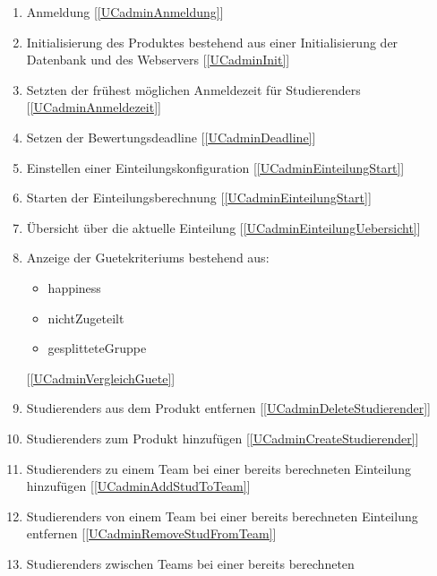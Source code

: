 \documentclass[parskip=full]{scrartcl}
\newcommand{\swtLabel}[1]{\textbf{/#1\arabic*0/}}
\newcommand{\testRef}[1]{[\ref{#1}]}
\begin{document}
\begin{enumerate}[label=\swtLabel{FA}, resume]
  \item Anmeldung \label{FAadminAnmeldung} \testRef{UCadminAnmeldung}
  \item Initialisierung des Produktes bestehend aus einer Initialisierung der
  Datenbank und des Webservers
  \label{FAadminInit} \testRef{UCadminInit}
  \item Setzten der frühest möglichen Anmeldezeit für \glspl{Studierender}
  \label{FAadminAnmeldezeit}
  \testRef{UCadminAnmeldezeit}
  \item Setzen der \gls{Bewertung}sdeadline \label{FAadminDeadline} \testRef{UCadminDeadline}
  \item Einstellen einer \gls{Einteilungskonfiguration} \label{FAadminParameter}
  \testRef{UCadminEinteilungStart}
  \item Starten der \gls{Einteilung}sberechnung \label{FAadminEinteilungstart}
  \testRef{UCadminEinteilungStart}
  \item Übersicht über die aktuelle \gls{Einteilung} \label{FAadminÜbersicht}
  \testRef{UCadminEinteilungUebersicht}
  \item Anzeige der \glspl{Guetekriterium} bestehend aus:
    \begin{itemize}
      \item \gls{happiness}
      \item \gls{nichtZugeteilt}
      \item \gls{gesplitteteGruppe}
    \end{itemize} \label{FAadminGüte} \testRef{UCadminVergleichGuete}
  \item \glspl{Studierender} aus dem Produkt entfernen
  \label{FAadminDeleteStudFromSystem} \testRef{UCadminDeleteStudierender}
  \item \glspl{Studierender} zum Produkt hinzufügen
  \label{FAadminAddStudToSystem} \testRef{UCadminCreateStudierender}
  \item \glspl{Studierender} zu einem \gls{Team} bei einer bereits berechneten
  \gls{Einteilung} hinzufügen \label{FAadminAddStudToTeam} \testRef{UCadminAddStudToTeam}
  \item \glspl{Studierender} von einem \gls{Team} bei einer bereits berechneten
  \gls{Einteilung} entfernen \label{FAadminRemoveStudFromTeam} \testRef{UCadminRemoveStudFromTeam}
  \item \glspl{Studierender} zwischen \glspl{Team} bei einer bereits berechneten

\end{enumerate}
\end{document}
